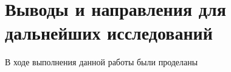 \chapter{Выводы и направления для дальнейших исследований} \label{conclusion}


В ходе выполнения данной работы были проделаны 

